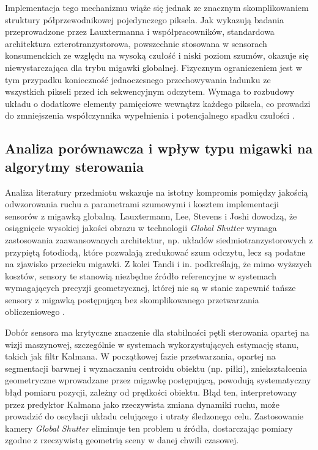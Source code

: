 \documentclass[a4paper,twoside,12pt]{book}
\begin{document}
Implementacja tego mechanizmu wiąże się jednak ze znacznym skomplikowaniem struktury półprzewodnikowej pojedynczego piksela. Jak wykazują badania przeprowadzone przez Lauxtermanna i współpracowników, standardowa architektura czterotranzystorowa, powszechnie stosowana w sensorach konsumenckich ze względu na wysoką czułość i niski poziom szumów, okazuje się niewystarczająca dla trybu migawki globalnej. Fizycznym ograniczeniem jest w tym przypadku konieczność jednoczesnego przechowywania ładunku ze wszystkich pikseli przed ich sekwencyjnym odczytem. Wymaga to rozbudowy układu o dodatkowe elementy pamięciowe wewnątrz każdego piksela, co prowadzi do zmniejszenia współczynnika wypełnienia i potencjalnego spadku czułości \cite{bib:LauxtermannGlobalShutter}.

\subsection*{Analiza porównawcza i wpływ typu migawki na algorytmy sterowania}

Analiza literatury przedmiotu wskazuje na istotny kompromis pomiędzy jakością odwzorowania ruchu a parametrami szumowymi i kosztem implementacji sensorów z migawką globalną. Lauxtermann, Lee, Stevens i Joshi dowodzą, że osiągnięcie wysokiej jakości obrazu w technologii \textit{Global Shutter} wymaga zastosowania zaawansowanych architektur, np. układów siedmiotranzystorowych z przypiętą fotodiodą, które pozwalają zredukować szum odczytu, lecz są podatne na zjawisko przecieku migawki. Z kolei Tandi i in. podkreślają, że mimo wyższych kosztów, sensory te stanowią niezbędne źródło referencyjne w systemach wymagających precyzji geometrycznej, której nie są w stanie zapewnić tańsze sensory z migawką postępującą bez skomplikowanego przetwarzania obliczeniowego \cite{bib:Tandi2025, bib:LauxtermannGlobalShutter}.

\newpage

Dobór sensora ma krytyczne znaczenie dla stabilności pętli sterowania opartej na wizji maszynowej, szczególnie w systemach wykorzystujących estymację stanu, takich jak filtr Kalmana. W początkowej fazie przetwarzania, opartej na segmentacji barwnej i wyznaczaniu centroidu obiektu (np. piłki), zniekształcenia geometryczne wprowadzane przez migawkę postępującą, powodują systematyczny błąd pomiaru pozycji, zależny od prędkości obiektu. Błąd ten, interpretowany przez predyktor Kalmana jako rzeczywista zmiana dynamiki ruchu, może prowadzić do oscylacji układu celującego i utraty śledzonego celu. Zastosowanie kamery \textit{Global Shutter} eliminuje ten problem u źródła, dostarczając pomiary zgodne z rzeczywistą geometrią sceny w danej chwili czasowej.
\end{document}
